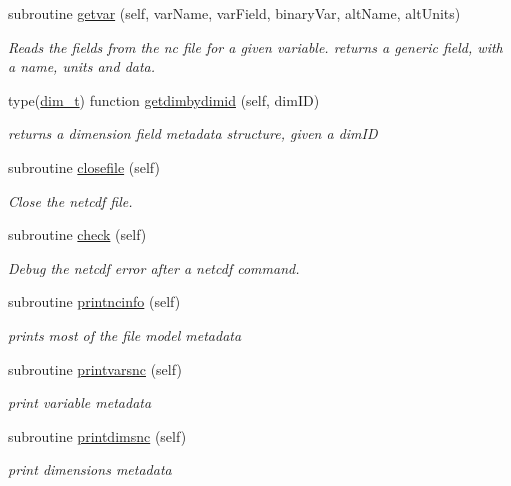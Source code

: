 \begin{DoxyCompactItemize}
subroutine \mbox{\hyperlink{namespacenetcdfparser__mod_aba877869db6bea7262d659133253cff7}{getvar}} (self, var\+Name, var\+Field, binary\+Var, alt\+Name, alt\+Units)
\begin{DoxyCompactList}\small\item\em Reads the fields from the nc file for a given variable. returns a generic field, with a name, units and data. \end{DoxyCompactList}\item 
type(\mbox{\hyperlink{structnetcdfparser__mod_1_1dim__t}{dim\+\_\+t}}) function \mbox{\hyperlink{namespacenetcdfparser__mod_a5fcd4b7fb27dbc9befd0a6fcfb9929a1}{getdimbydimid}} (self, dim\+ID)
\begin{DoxyCompactList}\small\item\em returns a dimension field metadata structure, given a dim\+ID \end{DoxyCompactList}\item 
subroutine \mbox{\hyperlink{namespacenetcdfparser__mod_a518627511cac4bf3dbc338bf3bfd5e24}{closefile}} (self)
\begin{DoxyCompactList}\small\item\em Close the netcdf file. \end{DoxyCompactList}\item 
subroutine \mbox{\hyperlink{namespacenetcdfparser__mod_ae1a034f6540ac7a1ce7d0e3831bb2f03}{check}} (self)
\begin{DoxyCompactList}\small\item\em Debug the netcdf error after a netcdf command. \end{DoxyCompactList}\item 
subroutine \mbox{\hyperlink{namespacenetcdfparser__mod_aeb48d33c014bae21b2fceaaa70cbdc67}{printncinfo}} (self)
\begin{DoxyCompactList}\small\item\em prints most of the file model metadata \end{DoxyCompactList}\item 
subroutine \mbox{\hyperlink{namespacenetcdfparser__mod_a6b57fa47d7bd796c75483216a51e5e04}{printvarsnc}} (self)
\begin{DoxyCompactList}\small\item\em print variable metadata \end{DoxyCompactList}\item 
subroutine \mbox{\hyperlink{namespacenetcdfparser__mod_ac01c000a97d23613684155708249ce89}{printdimsnc}} (self)
\begin{DoxyCompactList}\small\item\em print dimensions metadata \end{DoxyCompactList}\item 

\end{DoxyCompactItemize}
